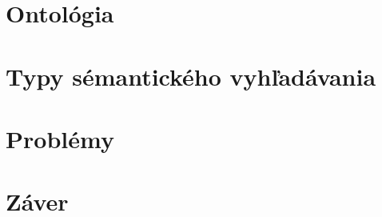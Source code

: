\documentclass[10pt,twoside,slovak,a4paper]{article}
\begin{document}
\section{Ontológia} \label{dolezita}




\section{Typy sémantického vyhľadávania} \label{dolezitejsia}




\section{Problémy} \label{nejaka}




\section{Záver} \label{zaver} %






\end{document}
